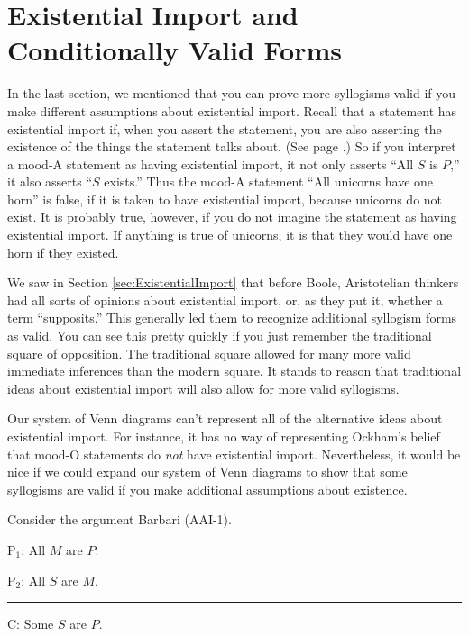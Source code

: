
\section{Existential Import and Conditionally Valid Forms}
\label{sec:conditionally_valid_forms}
In the last section, we mentioned that you can prove more syllogisms valid if you make different assumptions about existential import. Recall that a statement has existential import if, when you assert the statement, you are also asserting the existence of the things the statement talks about. (See page \pageref{def:Existential_import}.) So if you interpret a mood-A statement as having existential import, it not only asserts ``All $S$ is $P$,'' it also asserts ``$S$ exists.'' Thus the mood-A statement ``All unicorns have one horn'' is false, if it is taken to have existential import, because unicorns do not exist. It is probably  true, however, if you do not imagine the statement as having existential import. If anything is true of unicorns, it is that they would have one horn if they existed.

We saw in Section \ref{sec:ExistentialImport} that before Boole, Aristotelian thinkers had all sorts of opinions about existential import, or, as they put it, whether a term ``supposits.'' This generally led them to recognize additional syllogism forms as valid. You can see this pretty quickly if you just remember the traditional square of opposition. The traditional square allowed for many more valid immediate inferences than the modern square. It stands to reason that traditional ideas about existential import will also allow for more valid syllogisms. 

Our system of Venn diagrams can't represent all of the alternative ideas about existential import. For instance, it has no way of representing Ockham's belief that mood-O statements do \emph{not} have existential import. Nevertheless, it would be nice if we could expand our system of Venn diagrams to show that some syllogisms are valid if you make additional assumptions about existence. 

Consider the argument Barbari (AAI-1).

\begin{earg}
\item[P$_1$:] All $M$ are $P$.
\item[P$_2$:] All $S$ are $M$.
\vspace{-.5em}
\item [] \rule{0.2\linewidth}{.5pt} 
\item[C:] Some $S$ are $P$.
\end{earg} 
 
